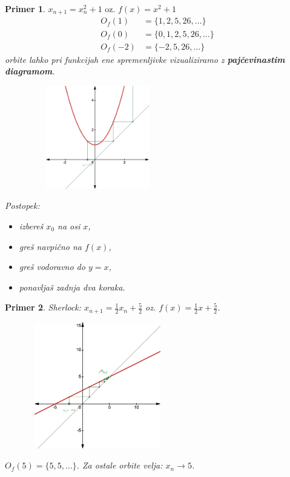 \documentclass{article}
\newtheorem{primer}{Primer}
\begin{document}
\begin{primer}
$x_{n+1} = x_n^2 + 1 \text{ oz. } f(x) = x^2 + 1$
\begin{align*}
O_f(1) &= \{1, 2, 5, 26, \dots\} \\ 
O_f(0) &= \{0, 1, 2, 5, 26, \dots\}\\
O_f(-2) &= \{-2, 5, 26, \dots \}
\end{align*}
orbite lahko pri funkcijah ene spremenljivke vizualiziramo z \textbf{pajčevinastim diagramom}.

\begin{figure}[h]
\center
    \includegraphics[width=6cm, height=4.5cm]{Grafi/cobweb1.png}
\end{figure}

\newpage
Postopek:
\begin{itemize}
\item izbereš $x_0$ na osi $x$,
\item greš navpično na $f(x)$,
\item greš vodoravno do $y = x$,
\item ponavljaš zadnja dva koraka.
\end{itemize}
\end{primer}


\begin{primer}
Sherlock: $x_{n+1} = \frac{1}{2} x_n + \frac{5}{2}$ oz. $f(x) = \frac{1}{2} x + \frac{5}{2}$.\\ 

\begin{figure}[h]
    \center
        \includegraphics[width=6cm, height=5.5cm]{Grafi/cobweb2.png}
    \end{figure}
    
$O_f(5) = \{5, 5, \dots \}$. Za ostale orbite velja: $x_n \rightarrow 5$.
\end{primer}
\end{document}
